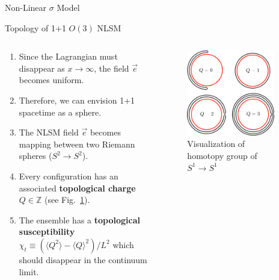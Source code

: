 \documentclass[18pt]{beamer}
\newcommand{\e}{\vec e}
\begin{document}
\begin{frame}{}
\begin{columns}[t]
\begin{column}{0.32\linewidth}
\begin{block}{Non-Linear $\sigma$ Model}
        \end{block}

        \begin{block}{Topology of 1+1 $O(3)$ NLSM}
            \begin{columns}
            \begin{column}{0.6\textwidth}
            \begin{enumerate}
                \item Since the Lagrangian must disappear as $x \rightarrow \infty$, the field $\e$ becomes uniform.
                \item Therefore, we can envision 1+1 spacetime as a sphere.
                \item The NLSM field $\e$ becomes mapping between two Riemann spheres ($S^2 \rightarrow S^2$).
                \item Every configuration has an associated {\bf topological charge} $Q\in\mathbb{Z}$ (see Fig.~\ref{fig:homotopy}).
                \item The ensemble has a {\bf topological susceptibility} $\chi_t \equiv \left(\langle Q^2 \rangle - \langle Q \rangle^2\right)/L^2$ which should disappear in the continuum limit.
            \end{enumerate}
            \end{column}
            \begin{column}{0.3\textwidth}
            \begin{figure}
                \includegraphics[width=0.9\textwidth]{homotopy.png}
                \caption{\label{fig:homotopy} Visualization of homotopy group of $S^1\rightarrow S^1$}
            \end{figure}
            \end{column}
            \end{columns}
        \end{block}


\end{column}
\end{columns}
\end{frame}
\end{document}
